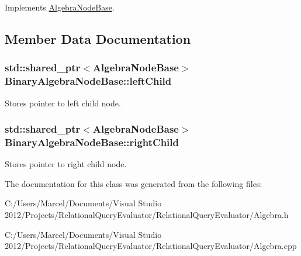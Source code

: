 Implements \hyperlink{class_algebra_node_base_aa9bdd02b0ddf793bda18bd146ccacb0d}{Algebra\+Node\+Base}.



\subsection{Member Data Documentation}
\hypertarget{class_binary_algebra_node_base_ab62ff77c5d90bd941b07a6f34e39f14b}{
\subsubsection[{left\+Child}]{\setlength{\rightskip}{0pt plus 5cm}std\+::shared\+\_\+ptr$<${\bf Algebra\+Node\+Base}$>$ Binary\+Algebra\+Node\+Base\+::left\+Child}}\label{class_binary_algebra_node_base_ab62ff77c5d90bd941b07a6f34e39f14b}
Stores pointer to left child node. \hypertarget{class_binary_algebra_node_base_ac97784ae724c411daca8b17664ce1122}{
\subsubsection[{right\+Child}]{\setlength{\rightskip}{0pt plus 5cm}std\+::shared\+\_\+ptr$<${\bf Algebra\+Node\+Base}$>$ Binary\+Algebra\+Node\+Base\+::right\+Child}}\label{class_binary_algebra_node_base_ac97784ae724c411daca8b17664ce1122}
Stores pointer to right child node. 

The documentation for this class was generated from the following files\+:\begin{DoxyCompactItemize}
\item 
C\+:/\+Users/\+Marcel/\+Documents/\+Visual Studio 2012/\+Projects/\+Relational\+Query\+Evaluator/\+Relational\+Query\+Evaluator/Algebra.\+h\item 
C\+:/\+Users/\+Marcel/\+Documents/\+Visual Studio 2012/\+Projects/\+Relational\+Query\+Evaluator/\+Relational\+Query\+Evaluator/Algebra.\+cpp\end{DoxyCompactItemize}
